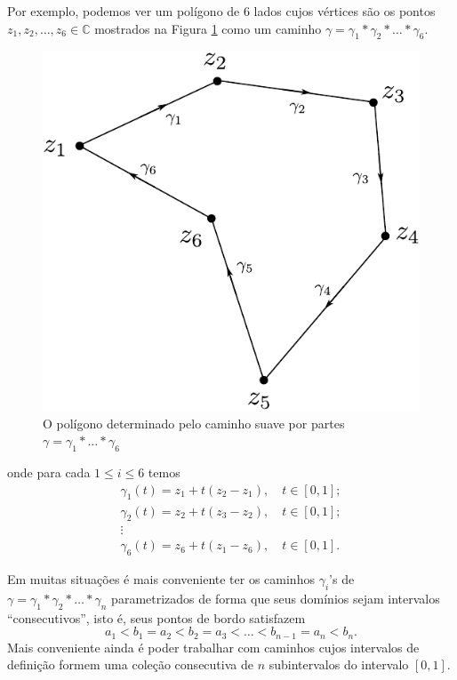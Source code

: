 Por exemplo, podemos ver um polígono de 6 lados cujos vértices são os 
pontos $z_1,z_2,\ldots, z_6\in\mathbb{C}$ mostrados na Figura \ref{fig-polig-6-lados}
como um caminho $\gamma = \gamma_1*\gamma_2*\ldots*\gamma_6$.

\begin{figure}[h]
\centering
\includegraphics[scale=0.6]{Figuras/fig-polig-6-lados}
\caption{O polígono determinado pelo caminho suave por partes $\gamma= \gamma_1*\ldots*\gamma_6$}
\label{fig-polig-6-lados}
\end{figure}


onde para cada $1\leqslant i\leqslant 6$ temos 
\begin{align*}
\gamma_1(t) = z_1+t(z_2-z_1), \quad t\in [0,1];\\
\gamma_2(t) = z_2+t(z_3-z_2), \quad t\in [0,1];\\
\vdots\qquad \qquad\qquad \qquad \\
\gamma_6(t) = z_6+t(z_1-z_6), \quad t\in[0,1].
\end{align*}

\bigskip 





Em muitas situações é mais conveniente ter os caminhos $\gamma_i$'s de 
$\gamma=\gamma_1*\gamma_2*\ldots*\gamma_n$
parametrizados de forma que seus domínios sejam intervalos ``consecutivos'', isto é, seus pontos
de bordo satisfazem 
\[
a_1<b_1=a_2<b_2=a_3<\ldots<b_{n-1}=a_{n}<b_n.
\]
Mais conveniente ainda é poder trabalhar com caminhos cujos intervalos de definição 
formem uma coleção consecutiva de $n$ subintervalos do intervalo $[0,1]$. 

